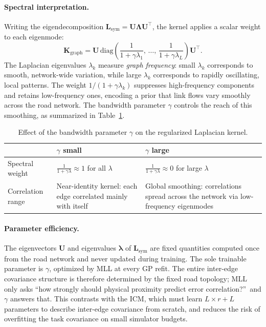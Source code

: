 \documentclass[11pt]{article}
\begin{document}
\paragraph{Spectral interpretation.}
Writing the eigendecomposition
$\mathbf{L}_{\mathrm{sym}} = \mathbf{U}\boldsymbol{\Lambda}\mathbf{U}^\top$,
the kernel applies a scalar weight to each eigenmode:
\begin{equation}
    \mathbf{K}_{\mathrm{graph}}
    = \mathbf{U}
      \,\mathrm{diag}\!\left(\frac{1}{1 + \gamma\lambda_1},\,\dots,\,
      \frac{1}{1 + \gamma\lambda_L}\right)
      \mathbf{U}^\top.
    \label{eq:graph-kernel-spectral}
\end{equation}
The Laplacian eigenvalues $\lambda_k$ measure \emph{graph frequency}: small
$\lambda_k$ corresponds to smooth, network-wide variation, while large
$\lambda_k$ corresponds to rapidly oscillating, local patterns. The weight
$1/(1 + \gamma\lambda_k)$ suppresses high-frequency components and retains
low-frequency ones, encoding a prior that link flows vary smoothly across the
road network. The bandwidth parameter $\gamma$ controls the reach of this
smoothing, as summarized in Table~\ref{tab:kernel-bandwidth}.

\begin{table}[ht]
\centering
\caption{Effect of the bandwidth parameter $\gamma$ on the regularized
Laplacian kernel.}
\label{tab:kernel-bandwidth}
\begin{tabular}{p{3cm}p{5.5cm}p{5.5cm}}
\toprule
 & \textbf{$\gamma$ small} & \textbf{$\gamma$ large} \\
\midrule
Spectral weight
    & $\tfrac{1}{1+\gamma\lambda} \approx 1$
      for all $\lambda$
    & $\tfrac{1}{1+\gamma\lambda} \approx 0$
      for large $\lambda$ \\[6pt]
Correlation range
    & Near-identity kernel: each edge correlated mainly with itself
    & Global smoothing: correlations spread across the network
      via low-frequency eigenmodes \\
\bottomrule
\end{tabular}
\end{table}

\paragraph{Parameter efficiency.}
The eigenvectors $\mathbf{U}$ and eigenvalues $\boldsymbol{\lambda}$ of
$\mathbf{L}_{\mathrm{sym}}$ are fixed quantities computed once from the road
network and never updated during training. The sole trainable parameter is
$\gamma$, optimized by MLL at every GP refit. The entire inter-edge covariance
structure is therefore determined by the fixed road topology; MLL only asks
``how strongly should physical proximity predict error correlation?''\ and
$\gamma$ answers that. This contrasts with the ICM, which must learn
$L \times r + L$ parameters to describe inter-edge covariance from scratch,
and reduces the risk of overfitting the task covariance on small simulator
budgets.
\end{document}
